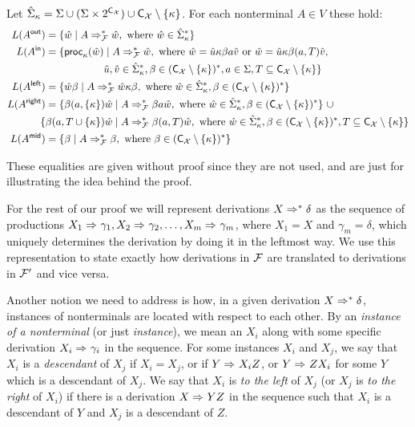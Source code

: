 %

Let $\hat{\Sigma}_{\kappa} = \Sigma \cup (\Sigma\times2^{\textsf{C}_{\mathcal{X}}}) \cup \textsf{C}_{\mathcal{X}}\setminus\{\kappa\}$. For each nonterminal $A\in V$ these hold:
\begin{align*}
	L(A^{\mathsf{out}}) &= \{\hat{w}\mid 
	A\Rightarrow_{\mathcal{F}}^* \hat{w}, 
	\ \text{where } \hat{w} \in  \hat{\Sigma}_{\kappa}^*\}\\
	L(A^{\mathsf{in}}) &= \{\mathsf{proc}_{\kappa}(\hat{w}) \mid 
	A\Rightarrow_{\mathcal{F}}^* \hat{w},
	\ \text{where } \hat{w} = \hat{u}\kappa\beta a \hat{v} \text{ or }\hat{w} = \hat{u}\kappa\beta (a, T) \hat{v},\\ 
	&\ \ \ \ \ \ \ \ \ \ \ \ \ \ \ \ \  \hat{u}, \hat{v} \in \hat{\Sigma}_{\kappa}^*, \beta\in (\textsf{C}_{\mathcal{X}}\setminus\{\kappa\})^*, a\in\Sigma, T\subseteq\textsf{C}_{\mathcal{X}}\setminus\{\kappa\}\}\\
	L(A^{\mathsf{left}}) &= \{\hat{w}\beta \mid 
	A\Rightarrow_{\mathcal{F}}^* \hat{w}\kappa\beta,
	\ \text{where } \hat{w}\in\hat{\Sigma}_{\kappa}^*, \beta\in(\textsf{C}_{\mathcal{X}}\setminus\{\kappa\})^*\}\\
	L(A^{\mathsf{right}}) &= \{\beta(a, \{\kappa\})\hat{w} \mid 
	A\Rightarrow_{\mathcal{F}}^* \beta a \hat{w},
	\ \text{where } \hat{w}\in \hat{\Sigma}_\kappa^*, \beta\in(\textsf{C}_{\mathcal{X}}\setminus\{\kappa\})^*
	\} \ \cup\\ 
	& \!\!\!\{\beta(a, T\cup \{\kappa\})\hat{w} \mid 
	A\Rightarrow_{\mathcal{F}}^* \beta (a,T) \hat{w},
	\ \text{where }\hat{w}\in\hat{\Sigma}_\kappa^*, \beta\in(\textsf{C}_{\mathcal{X}}\setminus\{\kappa\})^*, T\subseteq\textsf{C}_{\mathcal{X}}\setminus\{\kappa\}\}\\
	L(A^{\mathsf{mid}}) &= \{\beta\mid A \Rightarrow_{\mathcal{F}}^*\beta,
	\ \text{where }\beta\in(\textsf{C}_{\mathcal{X}}\setminus\{\kappa\})^*\}
\end{align*}

These equalities are given without proof since they are not used, and are just for illustrating the idea behind the proof.

For the rest of our proof we will represent derivations $X\Rightarrow_{}^* \delta$ as the sequence of productions $X_1\Rightarrow_{}\gamma_1, X_2\Rightarrow_{}\gamma_2, \ldots,X_m\Rightarrow_{}\gamma_m$, where $X_1 = X$ and $\gamma_m = \delta$, which uniquely determines the derivation by doing it in the leftmost way. We use this representation to state exactly how derivations in $\mathcal{F}$ are translated to derivations in $\mathcal{F}'$ and vice versa.

Another notion we need to address is how, in a given derivation $X\Rightarrow_{}^* \delta$, instances of nonterminals are located with respect to each other. By an \emph{instance of a nonterminal} (or just \emph{instance}), we mean an $X_i$ along with some specific derivation $X_i\Rightarrow_{} \gamma_i$ in the sequence. For some instances $X_i$ and $X_j$, we say that $X_i$ is a \emph{descendant} of $X_j$ if $X_i = X_j$, or if $Y \Rightarrow_{} X_i Z$, or $Y\Rightarrow_{} Z X_i$ for some $Y$ which is a descendant of $X_j$. We say that $X_i$ is \emph{to the left} of $X_j$ (or $X_j$ is \emph{to the right} of $X_i$) if there is a derivation $X\Rightarrow_{} Y Z$ in the sequence such that $X_i$ is a descendant of $Y$ and $X_j$ is a descendant of $Z$. 

